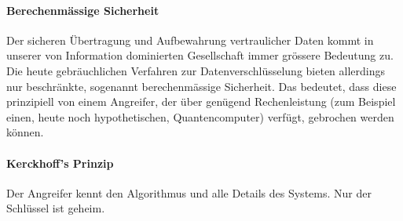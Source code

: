 \documentclass[10pt,a4paper]{article}
\begin{document}
\paragraph*{Berechenmässige Sicherheit}\label{para:Berechenmässige Sicherheit}Der sicheren Übertragung und Aufbewahrung vertraulicher Daten kommt in unserer von Information dominierten Gesellschaft immer grössere Bedeutung zu. Die heute gebräuchlichen Verfahren zur Datenverschlüsselung bieten allerdings nur beschränkte, sogenannt berechenmässige Sicherheit. Das bedeutet, dass diese prinzipiell von einem Angreifer, der über genügend Rechenleistung (zum Beispiel einen, heute noch hypothetischen, Quantencomputer) verfügt, gebrochen werden können\cite{renner2006}.

\paragraph*{Kerckhoff's Prinzip}\label{para:Kerckhoff's Prinzip}Der Angreifer kennt den Algorithmus und alle Details des Systems. Nur der Schlüssel ist geheim.
\end{document}
